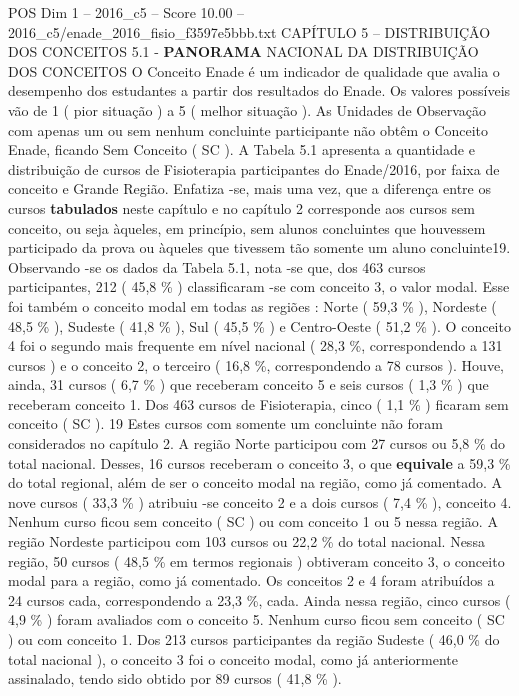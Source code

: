 \begin{textsample}{POS Dim 1 – 2016\_c5 – Score 10.00 – 2016\_c5/enade\_2016\_fisio\_f3597e5bbb.txt}  \label{ex:f1_pos_078}
CAPÍTULO 5 – DISTRIBUIÇÃO DOS CONCEITOS 5.1 - \textbf{PANORAMA} NACIONAL DA DISTRIBUIÇÃO DOS CONCEITOS O Conceito Enade é um indicador de qualidade que avalia o desempenho dos estudantes a partir dos resultados do Enade.
Os valores possíveis vão de 1 ( pior situação ) a 5 ( melhor situação ).
As Unidades de Observação com apenas um ou sem nenhum concluinte participante não obtêm o Conceito Enade, ficando Sem Conceito ( SC ).
A Tabela 5.1 apresenta a quantidade e distribuição de cursos de Fisioterapia participantes do Enade/2016, por faixa de conceito e Grande Região.
Enfatiza -se, mais uma vez, que a diferença entre os cursos \textbf{tabulados} neste capítulo e no capítulo 2 corresponde aos cursos sem conceito, ou seja àqueles, em princípio, sem alunos concluintes que houvessem participado da prova ou àqueles que tivessem tão somente um aluno concluinte19.
Observando -se os dados da Tabela 5.1, nota -se que, dos 463 cursos participantes, 212 ( 45,8 \% ) classificaram -se com conceito 3, o valor modal.
Esse foi também o conceito modal em todas as regiões : Norte ( 59,3 \% ), Nordeste ( 48,5 \% ), Sudeste ( 41,8 \% ), Sul ( 45,5 \% ) e Centro-Oeste ( 51,2 \% ).
O conceito 4 foi o segundo mais frequente em nível nacional ( 28,3 \%, correspondendo a 131 cursos ) e o conceito 2, o terceiro ( 16,8 \%, correspondendo a 78 cursos ).
Houve, ainda, 31 cursos ( 6,7 \% ) que receberam conceito 5 e seis cursos ( 1,3 \% ) que receberam conceito 1.
Dos 463 cursos de Fisioterapia, cinco ( 1,1 \% ) ficaram sem conceito ( SC ). 19 Estes cursos com somente um concluinte não foram considerados no capítulo 2.
A região Norte participou com 27 cursos ou 5,8 \% do total nacional.
Desses, 16 cursos receberam o conceito 3, o que \textbf{equivale} a 59,3 \% do total regional, além de ser o conceito modal na região, como já comentado.
A nove cursos ( 33,3 \% ) atribuiu -se conceito 2 e a dois cursos ( 7,4 \% ), conceito 4.
Nenhum curso ficou sem conceito ( SC ) ou com conceito 1 ou 5 nessa região.
A região Nordeste participou com 103 cursos ou 22,2 \% do total nacional.
Nessa região, 50 cursos ( 48,5 \% em termos regionais ) obtiveram conceito 3, o conceito modal para a região, como já comentado.
Os conceitos 2 e 4 foram atribuídos a 24 cursos cada, correspondendo a 23,3 \%, cada.
Ainda nessa região, cinco cursos ( 4,9 \% ) foram avaliados com o conceito 5.
Nenhum curso ficou sem conceito ( SC ) ou com conceito 1.
Dos 213 cursos participantes da região Sudeste ( 46,0 \% do total nacional ), o conceito 3 foi o conceito modal, como já anteriormente assinalado, tendo sido obtido por 89 cursos ( 41,8 \% ).

\end{textsample}
